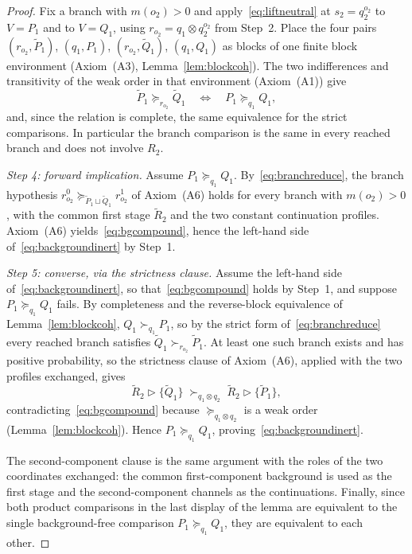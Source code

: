 \documentclass[11pt,a4paper]{article}
\theoremstyle{definition}
\newcommand{\1}{\mathbf 1}
\begin{document}
\begin{proof}
Fix a branch with $m(o_2)>0$ and apply~\eqref{eq:liftneutral} at $s_2=q_2^{o_2}$ to $V=P_1$ and to $V=Q_1$, using
$r_{o_2}=q_1\otimes q_2^{o_2}$ from Step~2.  Place the four pairs
$(r_{o_2},\widetilde P_1)$, $(q_1,P_1)$, $(r_{o_2},\widetilde Q_1)$, $(q_1,Q_1)$ as blocks of one finite block environment
(Axiom~\textup{(A3)}, Lemma~\ref{lem:blockcoh}).  The two indifferences and transitivity of the weak order in that
environment (Axiom~\textup{(A1)}) give
\begin{equation}
\widetilde P_1\succeq_{r_{o_2}}\widetilde Q_1
\quad\Longleftrightarrow\quad
P_1\succeq_{q_1}Q_1,
\tag{$\ddagger$}\label{eq:branchreduce}
\end{equation}
and, since the relation is complete, the same equivalence for the strict comparisons.  In particular the branch
comparison is the same in every reached branch and does not involve $R_2$.

\emph{Step 4: forward implication.}
Assume $P_1\succeq_{q_1}Q_1$.  By~\eqref{eq:branchreduce}, the branch hypothesis
$r_{o_2}^0\succeq_{\widetilde P_1\sqcup\widetilde Q_1}r_{o_2}^1$ of Axiom~\textup{(A6)} holds for every branch with
$m(o_2)>0$, with the common first stage $\widetilde R_2$ and the two constant continuation profiles.
Axiom~\textup{(A6)} yields~\eqref{eq:bgcompound}, hence the left-hand side of~\eqref{eq:backgroundinert} by Step~1.

\emph{Step 5: converse, via the strictness clause.}
Assume the left-hand side of~\eqref{eq:backgroundinert}, so that~\eqref{eq:bgcompound} holds by Step~1, and suppose
$P_1\succeq_{q_1}Q_1$ fails.  By completeness and the reverse-block equivalence of Lemma~\ref{lem:blockcoh},
$Q_1\succ_{q_1}P_1$, so by the strict form of~\eqref{eq:branchreduce} every reached branch satisfies
$\widetilde Q_1\succ_{r_{o_2}}\widetilde P_1$.  At least one such branch exists and has positive probability, so the
strictness clause of Axiom~\textup{(A6)}, applied with the two profiles exchanged, gives
\[
\widetilde R_2\triangleright\{\widetilde Q_1\}
\;\succ_{q_1\otimes q_2}\;
\widetilde R_2\triangleright\{\widetilde P_1\},
\]
contradicting~\eqref{eq:bgcompound} because $\succeq_{q_1\otimes q_2}$ is a weak order
(Lemma~\ref{lem:blockcoh}).  Hence $P_1\succeq_{q_1}Q_1$, proving~\eqref{eq:backgroundinert}.

The second-component clause is the same argument with the roles of the two coordinates exchanged: the common
first-component background is used as the first stage and the second-component channels as the continuations.  Finally,
since both product comparisons in the last display of the lemma are equivalent to the single background-free comparison
$P_1\succeq_{q_1}Q_1$, they are equivalent to each other.
\end{proof}
\end{document}
